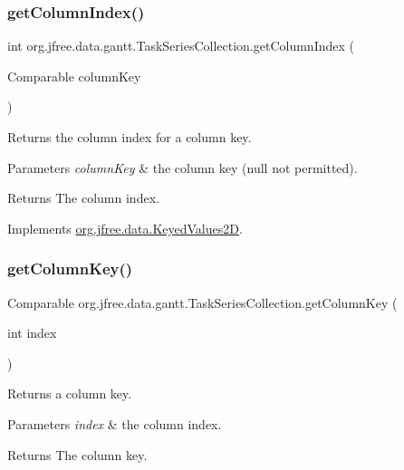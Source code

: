 \subsubsection{\texorpdfstring{get\+Column\+Index()}{getColumnIndex()}}
{\footnotesize\ttfamily int org.\+jfree.\+data.\+gantt.\+Task\+Series\+Collection.\+get\+Column\+Index (\begin{DoxyParamCaption}\item[{Comparable}]{column\+Key }\end{DoxyParamCaption})}

Returns the column index for a column key.


\begin{DoxyParams}{Parameters}
{\em column\+Key} & the column key ({\ttfamily null} not permitted).\\
\hline
\end{DoxyParams}
\begin{DoxyReturn}{Returns}
The column index. 
\end{DoxyReturn}


Implements \mbox{\hyperlink{interfaceorg_1_1jfree_1_1data_1_1_keyed_values2_d_a3360f2f612f16e8c90409d65e3992d38}{org.\+jfree.\+data.\+Keyed\+Values2D}}.

\mbox{\label{classorg_1_1jfree_1_1data_1_1gantt_1_1_task_series_collection_ae2f2a653fe8b60273034e7237b19118f}} 
\subsubsection{\texorpdfstring{get\+Column\+Key()}{getColumnKey()}}
{\footnotesize\ttfamily Comparable org.\+jfree.\+data.\+gantt.\+Task\+Series\+Collection.\+get\+Column\+Key (\begin{DoxyParamCaption}\item[{int}]{index }\end{DoxyParamCaption})}

Returns a column key.


\begin{DoxyParams}{Parameters}
{\em index} & the column index.\\
\hline
\end{DoxyParams}
\begin{DoxyReturn}{Returns}
The column key. 
\end{DoxyReturn}



